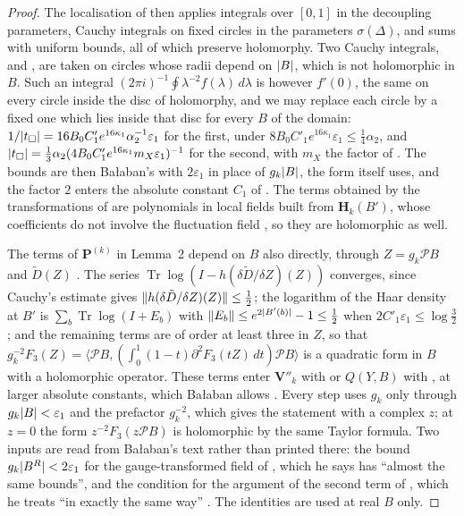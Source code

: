 \documentclass[11pt]{preprint}
\newcommand{\Tr}{\operatorname{Tr}}
\DeclarePairedDelimiter{\abs}{\lvert}{\rvert}
\DeclarePairedDelimiter{\norm}{\lVert}{\rVert}
\numberwithin{equation}{section}
\theoremstyle{definition}
\theoremstyle{remark}
\theoremstyle{plain}
\begin{document}
\begin{proof}
The localisation of \cite[pp.~7--11]{BalabanRG2} then applies integrals over $[0, 1]$ in the decoupling parameters, Cauchy integrals on fixed circles in the parameters $\sigma(\Delta)$, and sums with uniform bounds, all of which preserve holomorphy. Two Cauchy integrals, \cite[(1.22), p.~7]{BalabanRG2} and \cite[(3.15), p.~273, ll.~9--11]{BalabanRG1}, are taken on circles whose radii depend on $\abs B$, which is not holomorphic in $B$. Such an integral $(2\pi i)^{-1}\oint\lambda^{-2}f(\lambda)\,d\lambda$ is however $f'(0)$, the same on every circle inside the disc of holomorphy, and we may replace each circle by a fixed one which lies inside that disc for every $B$ of the domain: $1/\abs{t_\square} = 16B_0C'_1e^{16\kappa_1}\alpha_2^{-1}\varepsilon_1$ for the first, under $8B_0C'_1e^{16\kappa_1}\varepsilon_1 \leq \frac14\alpha_2$, and $\abs{t_\square} = \frac13\alpha_2(4B_0C'_1e^{16\kappa_1}m_X\varepsilon_1)^{-1}$ for the second, with $m_X$ the factor of \cite[(3.9)]{BalabanRG1}. The bounds are then Ba{\l}aban's with $2\varepsilon_1$ in place of $g_k\abs B$, the form \cite[(1.29), p.~8]{BalabanRG2} itself uses, and the factor $2$ enters the absolute constant $C_1$ of \cite[(1.36)]{BalabanRG2}. The terms obtained by the transformations of \cite[Sect.~4]{BalabanRG1} are polynomials in local fields built from $\mathbf H_k(B')$, whose coefficients do not involve the fluctuation field \cite[pp.~281--290]{BalabanRG1}, so they are holomorphic as well.

The terms of $\mathbf P^{(k)}$ in Lemma~2 depend on $B$ also directly, through $Z = g_k\mathcal PB$ and $\tilde D(Z)$ \cite[p.~268, ll.~9--13]{BalabanRG1}. The series $\Tr\log(I - h(\delta\tilde D/\delta Z)(Z))$ converges, since Cauchy's estimate gives $\norm{h(\delta\tilde D/\delta Z)(Z)} \leq \frac12$; the logarithm of the Haar density at $B'$ is $\sum_b\Tr\log(I + E_b)$ with $\norm{E_b} \leq e^{2\abs{B'(b)}} - 1 \leq \frac12$ when $2C'_1\varepsilon_1 \leq \log\frac32$; and the remaining terms are of order at least three in $Z$, so that $g_k^{-2}F_3(Z) = \langle\mathcal PB, (\int_0^1(1 - t)\partial^2F_3(tZ)\,dt)\mathcal PB\rangle$ is a quadratic form in $B$ with a holomorphic operator. These terms enter $\mathbf V''_k$ with \cite[(1.36)]{BalabanRG2} or $Q(Y, B)$ with \cite[(1.43)]{BalabanRG2}, at larger absolute constants, which Ba{\l}aban allows \cite[p.~11, ll.~5--6]{BalabanRG2}. Every step uses $g_k$ only through $g_k\abs B < \varepsilon_1$ and the prefactor $g_k^{-2}$, which gives the statement with a complex $z$; at $z = 0$ the form $z^{-2}F_3(z\mathcal PB)$ is holomorphic by the same Taylor formula. Two inputs are read from Ba{\l}aban's text rather than printed there: the bound $g_k\abs{B^R} < 2\varepsilon_1$ for the gauge-transformed field of \cite[p.~276, ll.~11--14]{BalabanRG1}, which he says has ``almost the same bounds'', and the condition \cite[(3.14)]{BalabanRG1} for the argument of the second term of \cite[(3.21)]{BalabanRG1}, which he treats ``in exactly the same way'' \cite[p.~274, ll.~30--33]{BalabanRG1}. The identities \cite[(1.33), (1.41)]{BalabanRG2} are used at real $B$ only.
\end{proof}
\end{document}
